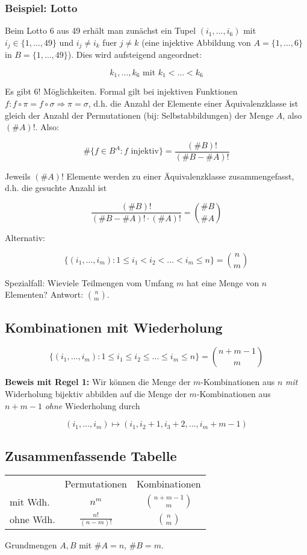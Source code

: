 \subsubsection{Beispiel: Lotto}

Beim Lotto 6 aus 49 erhält man zunächst ein Tupel $(i_1,\ldots,i_6)$ mit $i_j
\in \{1,\ldots,49\}$ und $i_j \neq i_k$ fuer $j \neq k$ (eine injektive
Abbildung von $A = \{1,\ldots,6\}$ in $B = \{1,\ldots,49\}$). Dies wird
aufsteigend angeordnet:

\[ k_1,\ldots,k_6 \text{ mit } k_1 < \ldots < k_6 \]

Es gibt $6!$ Möglichkeiten. Formal gilt bei injektiven Funktionen $f : f
\circ \pi = f \circ \sigma \Rightarrow \pi = \sigma$, d.h. die Anzahl der
Elemente einer Äquivalenzklasse ist gleich der Anzahl der Permutationen
(bij: Selbstabbildungen) der Menge $A$, also $(\#A)!$. Also:

\[ \#\{ f \in B^A : f \text{ injektiv} \} = \frac{(\#B)!}{(\#B - \#A)!} \]

Jeweils $(\#A)!$ Elemente werden zu einer Äquivalenzklasse zusammengefasst,
d.h. die gesuchte Anzahl ist

\[ \frac{(\#B)!}{(\#B - \#A)! \cdot (\#A)!} = {\#B \choose \#A} \]

Alternativ:

\[ \{ (i_1,\ldots,i_m): 1 \leq i_1 < i_2 < \ldots < i_m \leq n \} = {n \choose
m} \]

Spezialfall: Wieviele Teilmengen vom Umfang $m$ hat eine Menge von $n$
Elementen? Antwort: $n \choose m$.


\subsection{Kombinationen mit Wiederholung}

\[ \{(i_1,\ldots,i_m): 1 \leq i_1 \leq i_2 \leq \ldots \leq i_m \leq n \} =
{n+m-1 \choose m} \]

\textbf{Beweis mit Regel 1:} Wir können die Menge der $m$-Kombinationen aus
$n$ \emph{mit} Widerholung bijektiv abbilden auf die Menge der
$m$-Kombinationen aus $n+m-1$ \emph{ohne} Wiederholung durch

\[ (i_1,\ldots,i_m) \mapsto (i_1, i_2+1, i_3+2, \ldots, i_m + m-1) \]


\subsection{Zusammenfassende Tabelle}

\begin{center}
\begin{tabular}{l|c|c}
    ~         & Permutationen       & Kombinationen     \\
    \cline{2-3}
    mit Wdh.  & $n^m$               & $n+m-1 \choose m$ \\
    ohne Wdh. & $\frac{n!}{(n-m)!}$ & $n \choose m$     \\
\end{tabular}
\end{center}

{\scriptsize Grundmengen $A,B$ mit $\#A=n$, $\#B=m$.}


